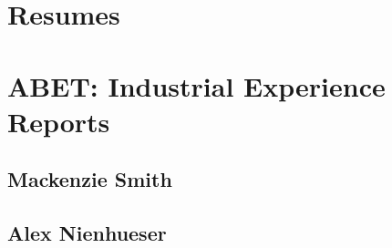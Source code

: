 

\section{Resumes}



	  
      
%     

\section{ABET:  Industrial Experience Reports}

\subsection{Mackenzie Smith}

% 

\subsection{Alex Nienhueser}

% 




